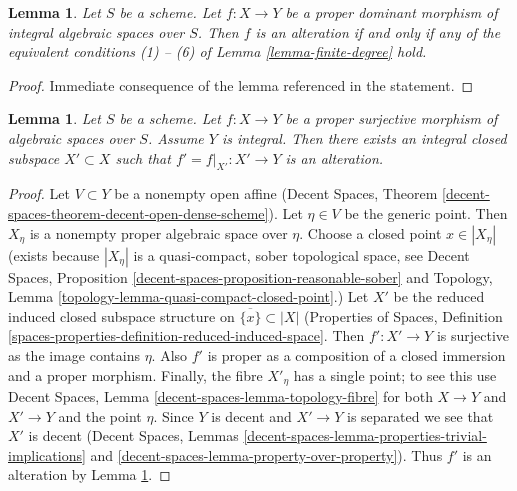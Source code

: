 \documentclass{stacks-project}
\theoremstyle{plain}
\newtheorem{lemma}[subsection]{Lemma}
\theoremstyle{definition}
\theoremstyle{remark}
\numberwithin{equation}{subsection}
\begin{document}
\begin{lemma}
\label{lemma-alteration-generically-finite}
Let $S$ be a scheme. Let $f : X \to Y$ be a proper dominant morphism of
integral algebraic spaces over $S$. Then $f$ is an alteration
if and only if any of the equivalent conditions (1) -- (6) of
Lemma \ref{lemma-finite-degree} hold.
\end{lemma}

\begin{proof}
Immediate consequence of the lemma referenced in the statement.
\end{proof}

\begin{lemma}
\label{lemma-alteration-contained-in}
Let $S$ be a scheme. Let $f : X \to Y$ be a proper surjective morphism of
algebraic spaces over $S$. Assume $Y$ is integral. Then
there exists an integral closed subspace $X' \subset X$ such that
$f' = f|_{X'} : X' \to Y$ is an alteration.
\end{lemma}

\begin{proof}
Let $V \subset Y$ be a nonempty open affine
(Decent Spaces, Theorem \ref{decent-spaces-theorem-decent-open-dense-scheme}).
Let $\eta \in V$ be the generic point. Then
$X_\eta$ is a nonempty proper algebraic space over $\eta$.
Choose a closed point $x \in |X_\eta|$
(exists because $|X_\eta|$ is a quasi-compact, sober
topological space, see Decent Spaces, Proposition
\ref{decent-spaces-proposition-reasonable-sober}
and Topology, Lemma \ref{topology-lemma-quasi-compact-closed-point}.)
Let $X'$ be the reduced induced closed subspace structure on
$\overline{\{x\}} \subset |X|$ (Properties of Spaces, Definition
\ref{spaces-properties-definition-reduced-induced-space}.
Then $f' : X' \to Y$ is surjective as the image contains $\eta$.
Also $f'$ is proper as a composition of a closed immersion
and a proper morphism. Finally, the fibre $X'_\eta$ has a
single point; to see this use
Decent Spaces, Lemma \ref{decent-spaces-lemma-topology-fibre}
for both $X \to Y$ and $X' \to Y$ and the point $\eta$.
Since $Y$ is decent and $X' \to Y$ is separated we see that $X'$ is decent
(Decent Spaces, Lemmas
\ref{decent-spaces-lemma-properties-trivial-implications} and
\ref{decent-spaces-lemma-property-over-property}).
Thus $f'$ is an alteration by
Lemma \ref{lemma-alteration-generically-finite}.
\end{proof}
\end{document}
